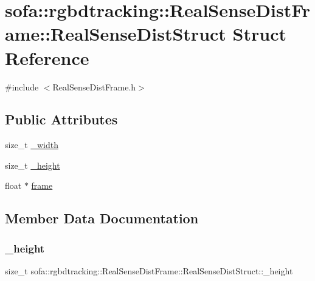 \hypertarget{structsofa_1_1rgbdtracking_1_1_real_sense_dist_frame_1_1_real_sense_dist_struct}{}\section{sofa\+:\+:rgbdtracking\+:\+:Real\+Sense\+Dist\+Frame\+:\+:Real\+Sense\+Dist\+Struct Struct Reference}
\label{structsofa_1_1rgbdtracking_1_1_real_sense_dist_frame_1_1_real_sense_dist_struct}


{\ttfamily \#include $<$Real\+Sense\+Dist\+Frame.\+h$>$}

\subsection*{Public Attributes}
\begin{DoxyCompactItemize}
\item 
size\+\_\+t \hyperlink{structsofa_1_1rgbdtracking_1_1_real_sense_dist_frame_1_1_real_sense_dist_struct_a9aebe63c9f0144dbc95337cc09c2266f}{\+\_\+width}
\item 
size\+\_\+t \hyperlink{structsofa_1_1rgbdtracking_1_1_real_sense_dist_frame_1_1_real_sense_dist_struct_a7f08a343322668464a50912a970e1246}{\+\_\+height}
\item 
float $\ast$ \hyperlink{structsofa_1_1rgbdtracking_1_1_real_sense_dist_frame_1_1_real_sense_dist_struct_a8223b01562f5990926d5ebe4f449e5b6}{frame}
\end{DoxyCompactItemize}


\subsection{Member Data Documentation}
\mbox{\label{structsofa_1_1rgbdtracking_1_1_real_sense_dist_frame_1_1_real_sense_dist_struct_a7f08a343322668464a50912a970e1246}} 
\subsubsection{\texorpdfstring{\+\_\+height}{\_height}}
{\footnotesize\ttfamily size\+\_\+t sofa\+::rgbdtracking\+::\+Real\+Sense\+Dist\+Frame\+::\+Real\+Sense\+Dist\+Struct\+::\+\_\+height}


